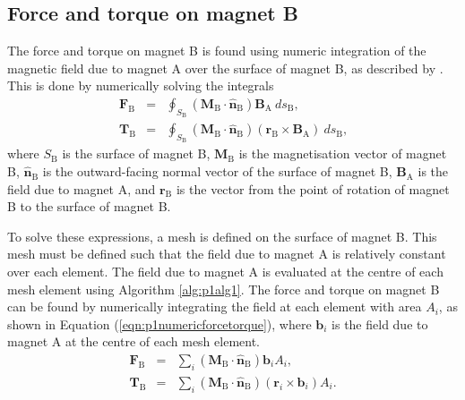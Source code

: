 \subsection{Force and torque on magnet B}
The force and torque on magnet B is found using numeric integration of the magnetic field due to magnet A over the surface of magnet B, as described by \textcite{Furlani2001}. This is done by numerically solving the integrals
\begin{subequations}
    \begin{eqnarray}
	\mathbf{F}_\text{B} &=& \oint_{S_\text{B}} \left( \mathbf{M}_\text{B} \cdot \mathbf{\hat{n}}_\text{B} \right) \mathbf{B}_\text{A}\  ds_\text{B} \text{,} \\
	\mathbf{T}_\text{B} &=& \oint_{S_\text{B}} \left( \mathbf{M}_\text{B} \cdot \mathbf{\hat{n}}_\text{B} \right) \left( \mathbf{r}_\text{B} \times \mathbf{B}_\text{A} \right)\ ds_\text{B} \text{,}
	\end{eqnarray}
\end{subequations}
\noindent where \({S_\mathrm{B}}\) is the surface of magnet B, \({\mathbf{M}_\mathrm{B}}\) is the magnetisation vector of magnet B, \({\mathbf{\hat{n}}_\mathrm{B}}\) is the outward-facing normal vector of the surface of magnet B, \({\mathbf{B}_\mathrm{A}}\) is the field due to magnet A, and \({\mathbf{r}_\mathrm{B}}\) is the vector from the point of rotation of magnet B to the surface of magnet B.

To solve these expressions, a mesh is defined on the surface of magnet B. This mesh must be defined such that the field due to magnet A is relatively constant over each element. The field due to magnet A is evaluated at the centre of each mesh element using Algorithm \ref{alg:p1alg1}. The force and torque on magnet B can be found by numerically integrating the field at each element with area \(A_i\), as shown in Equation (\ref{eqn:p1numericforcetorque}), where \(\mathbf{b}_i\) is the field due to magnet A at the centre of each mesh element.
\begin{subequations}
	\label{eqn:p1numericforcetorque}
	\begin{eqnarray}
	\mathbf{F}_\text{B} &=& \sum_i \left( \mathbf{M}_\text{B} \cdot \mathbf{\hat{n}}_\text{B} \right) {\mathbf{b}_i A_i} \text{,} \\
	\mathbf{T}_\text{B} &=& \sum_i \left( \mathbf{M}_\text{B} \cdot \mathbf{\hat{n}}_\text{B} \right) \left( {\mathbf{r}_i \times \mathbf{b}_i} \right) A_i \text{.}
	\end{eqnarray}
\end{subequations}

